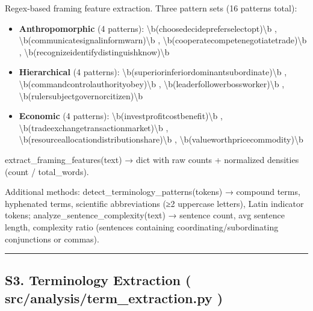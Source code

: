 \documentclass[
]{article}
\providecommand{\tightlist}{%
  \setlength{\itemsep}{0pt}\setlength{\parskip}{0pt}}
\numberwithin{equation}{section}
\renewcommand{\texttt}[1]{%
    \colorbox{codebg}{\color{codefg}\ttfamily #1}%
}
\begin{document}
Regex-based framing feature extraction. Three pattern sets (16 patterns
total):

\begin{itemize}
\tightlist
\item
  \textbf{Anthropomorphic} (4 patterns):
  \texttt{\textbackslash{}b(choose\textbar{}decide\textbar{}prefer\textbar{}select\textbar{}opt)\textbackslash{}b},
  \texttt{\textbackslash{}b(communicate\textbar{}signal\textbar{}inform\textbar{}warn)\textbackslash{}b},
  \texttt{\textbackslash{}b(cooperate\textbar{}compete\textbar{}negotiate\textbar{}trade)\textbackslash{}b},
  \texttt{\textbackslash{}b(recognize\textbar{}identify\textbar{}distinguish\textbar{}know)\textbackslash{}b}
\item
  \textbf{Hierarchical} (4 patterns):
  \texttt{\textbackslash{}b(superior\textbar{}inferior\textbar{}dominant\textbar{}subordinate)\textbackslash{}b},
  \texttt{\textbackslash{}b(command\textbar{}control\textbar{}authority\textbar{}obey)\textbackslash{}b},
  \texttt{\textbackslash{}b(leader\textbar{}follower\textbar{}boss\textbar{}worker)\textbackslash{}b},
  \texttt{\textbackslash{}b(ruler\textbar{}subject\textbar{}governor\textbar{}citizen)\textbackslash{}b}
\item
  \textbf{Economic} (4 patterns):
  \texttt{\textbackslash{}b(invest\textbar{}profit\textbar{}cost\textbar{}benefit)\textbackslash{}b},
  \texttt{\textbackslash{}b(trade\textbar{}exchange\textbar{}transaction\textbar{}market)\textbackslash{}b},
  \texttt{\textbackslash{}b(resource\textbar{}allocation\textbar{}distribution\textbar{}share)\textbackslash{}b},
  \texttt{\textbackslash{}b(value\textbar{}worth\textbar{}price\textbar{}commodity)\textbackslash{}b}
\end{itemize}

\texttt{extract\_framing\_features(text)} → dict with raw counts +
normalized densities (count / total\_words).

Additional methods: \texttt{detect\_terminology\_patterns(tokens)} →
compound terms, hyphenated terms, scientific abbreviations (≥2 uppercase
letters), Latin indicator tokens;
\texttt{analyze\_sentence\_complexity(text)} → sentence count, avg
sentence length, complexity ratio (sentences containing
coordinating/subordinating conjunctions or commas).

\begin{center}\rule{0.5\linewidth}{0.5pt}\end{center}

\subsection{\texorpdfstring{S3. Terminology Extraction
(\texttt{src/analysis/term\_extraction.py})}{S3. Terminology Extraction (src/analysis/term\_extraction.py)}}\label{s3.-terminology-extraction-srcanalysisterm_extraction.py}
\end{document}
